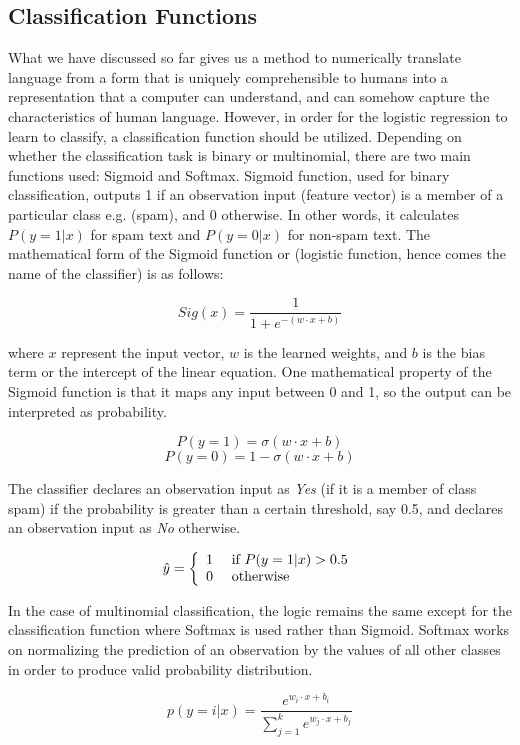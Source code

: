 \subsection{Classification Functions}
What we have discussed so far gives us a method to numerically translate language from a form that is uniquely comprehensible to humans into a representation that a computer can understand, and can somehow capture the characteristics of human language. However, in order for the logistic regression to learn to classify, a classification function should be utilized. Depending on whether the classification task is binary or multinomial, there are two main functions used: Sigmoid and Softmax. Sigmoid function, used for binary classification, outputs 1 if an observation input (feature vector) is a member of a particular class e.g. (spam), and 0 otherwise. In other words, it calculates $P(y=1|x)$ for spam text and $P(y=0|x)$ for non-spam text. The mathematical form of the Sigmoid function or (logistic function, hence comes the name of the classifier) is as follows:

$$Sig ( x ) = \frac { 1 } { 1 + e ^ { - (w \cdot x +b)} }$$ 

where $x$ represent the input vector, $w$ is the learned weights, and $b$ is the bias term or the intercept of the linear equation. One mathematical property of the Sigmoid function is that it maps any input between 0 and 1, so the output can be interpreted as probability. 

$$ P ( y = 1 ) = \sigma ( w \cdot x + b ) $$
$$ P ( y = 0 ) = 1 - \sigma ( w \cdot x + b ) $$

The classifier declares an observation input as \emph{Yes} (if it is a member of class spam) if the probability is greater than a certain threshold, say 0.5, and declares an observation input as \emph{No} otherwise. 

$$  \hat { y } = \left\{ \begin{array} { l l } { 1 } & { \text { if } P ( y = 1 | x ) > 0.5 } \\ { 0 } & { \text { otherwise } } \end{array} \right.  $$


In the case of multinomial classification, the logic remains the same except for the classification function where Softmax is used rather than Sigmoid. Softmax works on normalizing the prediction of an observation by the values of all other classes in order to produce valid probability distribution. 

$$p ( y = i | x ) = \frac { e ^ { w _ { i } \cdot x + b _ { i } } } { \sum _ { j = 1 } ^ { k } e ^ { w _ { j } \cdot x + b _ { j } } }$$



